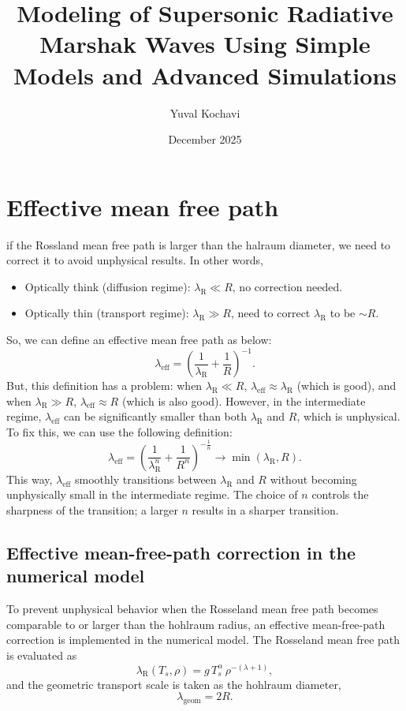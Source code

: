 \documentclass{article}
\title{Modeling of Supersonic Radiative Marshak Waves Using Simple Models and Advanced Simulations}
\author{Yuval Kochavi}
\date{December 2025}
\begin{document}
\maketitle

\section{Effective mean free path}
if the Rossland mean free path is larger than the halraum diameter, we need to correct it to avoid unphysical results. In other words,
\begin{itemize}
    \item Optically think (diffusion regime): $\lambda_{\mathrm{R}} \ll R$, no correction needed.
    \item Optically thin (transport regime): $\lambda_{\mathrm{R}} \gg R$, need to correct $\lambda_{\mathrm{R}}$ to be $\sim R$.
\end{itemize}
So, we can define an effective mean free path as below:
\begin{equation}
\lambda_{\mathrm{eff}} = \left( \frac{1}{\lambda_{\mathrm{R}}} + \frac{1}{R} \right)^{-1}.
\end{equation}
But, this definition has a problem: when $\lambda_{\mathrm{R}} \ll R$, $\lambda_{\mathrm{eff}} \approx \lambda_{\mathrm{R}}$ (which is good), and when $\lambda_{\mathrm{R}} \gg R$, $\lambda_{\mathrm{eff}} \approx R$ (which is also good). However, in the intermediate regime, $\lambda_{\mathrm{eff}}$ can be significantly smaller than both $\lambda_{\mathrm{R}}$ and $R$, which is unphysical. To fix this, we can use the following definition:
\begin{equation}
\lambda_{\mathrm{eff}} = \left( \frac{1}{\lambda_{\mathrm{R}}^n} + \frac{1}{R^n} \right)^{-\frac{1}{n}} \to \min\left( \lambda_{\mathrm{R}}, R \right).
\end{equation}
This way, $\lambda_{\mathrm{eff}}$ smoothly transitions between $\lambda_{\mathrm{R}}$ and $R$ without becoming unphysically small in the intermediate regime. The choice of $n$ controls the sharpness of the transition; a larger $n$ results in a sharper transition.

\subsection*{Effective mean-free-path correction in the numerical model}

To prevent unphysical behavior when the Rosseland mean free path becomes comparable to or larger than the hohlraum radius, an effective mean-free-path correction is implemented in the numerical model.  
The Rosseland mean free path is evaluated as
\begin{equation}
\lambda_{\mathrm{R}}(T_s,\rho)
=
g\,T_s^{\alpha}\,\rho^{-(\lambda+1)},
\end{equation}
and the geometric transport scale is taken as the hohlraum diameter,
\begin{equation}
\lambda_{\mathrm{geom}} = 2R.
\end{equation}
\end{document}
